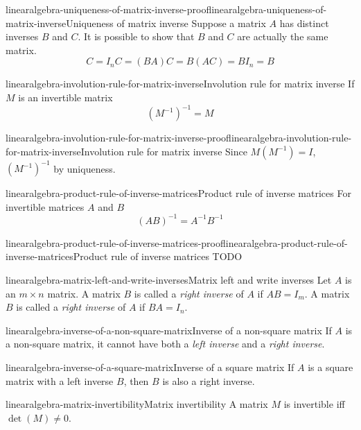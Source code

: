 \documentclass[preview]{standalone}
\begin{document}
\begin{snippetproof}{linearalgebra-uniqueness-of-matrix-inverse-proof}{linearalgebra-uniqueness-of-matrix-inverse}{Uniqueness of matrix inverse}
    Suppose a matrix \(A\) has distinct inverses \(B\)
    and \(C\).
    It is possible to show that \(B\) and \(C\) are actually
    the same matrix.
    \[
        C=I_n C = (BA) C = B (AC) = BI_n = B
    \]
\end{snippetproof}

\begin{snippetproposition}{linearalgebra-involution-rule-for-matrix-inverse}{Involution rule for matrix inverse}
    If \(M\) is an invertible matrix
    \[
        {(M^{-1})}^{-1} = M
    \]
\end{snippetproposition}

\begin{snippetproof}{linearalgebra-involution-rule-for-matrix-inverse-proof}{linearalgebra-involution-rule-for-matrix-inverse}{Involution rule for matrix inverse}
    Since \(M(M^{-1}) = I\), \({(M^{-1})}^{-1}\)
    by uniqueness. %
\end{snippetproof}

\begin{snippetproposition}{linearalgebra-product-rule-of-inverse-matrices}{Product rule of inverse matrices}
    For invertible matrices \(A\) and \(B\)
    \[
        {(AB)}^{-1} = A^{-1} B^{-1}
    \]
\end{snippetproposition}

\begin{snippetproof}{linearalgebra-product-rule-of-inverse-matrices-proof}{linearalgebra-product-rule-of-inverse-matrices}{Product rule of inverse matrices}
    TODO
\end{snippetproof}

\begin{snippetdefinition}{linearalgebra-matrix-left-and-write-inverses}{Matrix left and write inverses}
    Let \(A\) is an \(m \times n\) matrix. A matrix \(B\)
    is called a \textit{right inverse} of \(A\)
    if \(AB=I_m\).
    A matrix \(B\) is called a \textit{right inverse} of \(A\)
    if \(BA=I_n\).
\end{snippetdefinition}

\begin{snippetproposition}{linearalgebra-inverse-of-a-non-square-matrix}{Inverse of a non-square matrix}
    If \(A\) is a non-square matrix, it cannot have
    both a \textit{left inverse} and a \textit{right inverse}.
\end{snippetproposition}

\begin{snippetproposition}{linearalgebra-inverse-of-a-square-matrix}{Inverse of a square matrix}
    If \(A\) is a square matrix
    with a left inverse \(B\),
    then \(B\) is also a right inverse.
\end{snippetproposition}

\begin{snippetproposition}{linearalgebra-matrix-invertibility}{Matrix invertibility}
    A matrix \(M\) is invertible iff
    \(\det(M) \neq 0\).
\end{snippetproposition}
\end{document}
